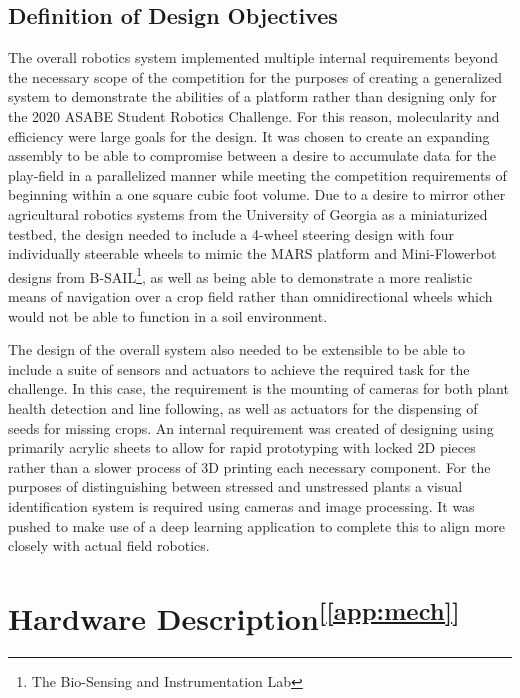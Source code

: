 \documentclass[11pt, twoside]{report}
\newcommand{\refapp}[1]{\textsuperscript{[\ref{#1}]}}
\begin{document}
\subsection{Definition of Design Objectives}
The overall robotics system implemented multiple internal requirements beyond the necessary scope of the competition for the purposes of creating a generalized system to demonstrate the abilities of a platform rather than designing only for the 2020 ASABE Student Robotics Challenge. For this reason, molecularity and efficiency were large goals for the design. It was chosen to create an expanding assembly to be able to compromise between a desire to accumulate data for the play-field in a parallelized manner while meeting the competition requirements of beginning within a one square cubic foot volume. Due to a desire to mirror other agricultural robotics systems from the University of Georgia as a miniaturized testbed, the design needed to include a 4-wheel steering design with four individually steerable wheels to mimic the MARS platform and Mini-Flowerbot designs from B-SAIL\footnote{The Bio-Sensing and Instrumentation Lab}, as well as being able to demonstrate a more realistic means of navigation over a crop field rather than omnidirectional wheels which would not be able to function in a soil environment. 

The design of the overall system also needed to be extensible to be able to include a suite of sensors and actuators to achieve the required task for the challenge. In this case, the requirement is the mounting of cameras for both plant health detection and line following, as well as actuators for the dispensing of seeds for missing crops. An internal requirement was created of designing using primarily acrylic sheets to allow for rapid prototyping with locked 2D pieces rather than a slower process of 3D printing each necessary component. For the purposes of distinguishing between stressed and unstressed plants a visual identification system is required using cameras and image processing. It was pushed to make use of a deep learning application to complete this to align more closely with actual field robotics.

\section{Hardware Description\refapp{app:mech}}
\end{document}
